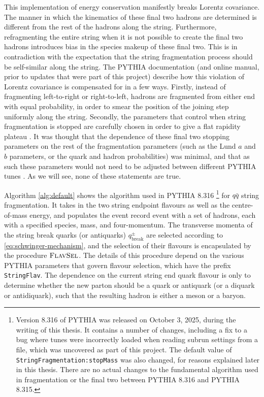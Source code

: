 \documentclass[12pt,a4paper]{report}
\begin{document}
This implementation of energy conservation manifestly breaks Lorentz covariance. The manner in which the kinematics of these final two hadrons are determined is different from the rest of the hadrons along the string. Furthermore, refragmenting the entire string when it is not possible to create the final two hadrons introduces bias in the species makeup of these final two. This is in contradiction with the expectation that the string fragmentation process should be self-similar along the string. The PYTHIA documentation (and online manual, prior to updates that were part of this project) describe how this violation of Lorentz covariance is compensated for in a few ways. Firstly, instead of fragmenting left-to-right or right-to-left, hadrons are fragmented from either end with equal probability, in order to smear the position of the joining step uniformly along the string. Secondly, the parameters that control when string fragmentation is stopped are carefully chosen in order to give a flat rapidity plateau \cite{Bierlich:2022pfr,Sjostrand:2006za}. It was thought that the dependence of these final two stopping parameters on the rest of the fragmentation parameters (such as the Lund $a$ and $b$ parameters, or the quark and hadron probabilities) was minimal, and that as such these parameters would not need to be adjusted between different PYTHIA tunes \cite{PYTHIAmanualold}. As we will see, none of these statements are true.

Algorithm \ref{alg:default} shows the algorithm used in PYTHIA 8.316 \footnote{Version 8.316 of PYTHIA was released on October 3, 2025, during the writing of this thesis. It contains a number of changes, including a fix to a bug where tunes were incorrectly loaded when reading subrun settings from a file, which was uncovered as part of this project. The default value of \texttt{StringFragmentation:stopMass} was also changed, for reasons explained later in this thesis. There are no actual changes to the fundamental algorithm used in fragmentation or the final two between PYTHIA 8.316 and PYTHIA 8.315.} for $q\bar{q}$ string fragmentation. It takes in the two string endpoint flavours as well as the centre-of-mass energy, and populates the event record $\text{event}$ with a set of hadrons, each with a specified species, mass, and four-momentum. The transverse momenta of the string break quarks (or antiquarks) $q_\text{break}^\pm$ are selected according to \eqref{eq:schwinger-mechanism}, and the selection of their flavours is encapsulated by the procedure $\textsc{FlavSel}$. The details of this procedure depend on the various PYTHIA parameters that govern flavour selection, which have the prefix \texttt{StringFlav}. The dependence on the current string end quark flavour is only to determine whether the new parton should be a quark or antiquark (or a diquark or antidiquark), such that the resulting hadron is either a meson or a baryon.
\end{document}
